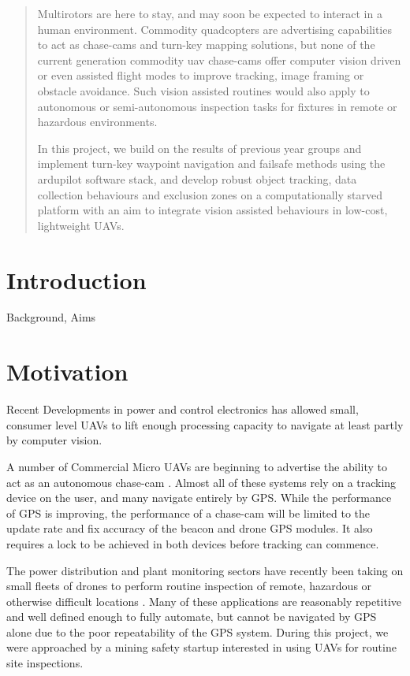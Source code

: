 \documentclass[a4paper, 11pt, titlepage]{article}
\begin{document}
  

  \begin{abstract}
  Multirotors are here to stay, and may soon be expected to interact in a human environment.
  Commodity quadcopters are advertising capabilities to act as  chase-cams and turn-key mapping solutions, but none of the current generation commodity uav chase-cams offer computer vision driven or even assisted flight modes to improve tracking, image framing or obstacle avoidance.  Such vision assisted routines would also apply to autonomous or semi-autonomous inspection tasks for fixtures in remote or hazardous environments.

  In this project, we build on the results of previous year groups and implement turn-key waypoint navigation and failsafe methods using the ardupilot software stack, and develop robust object tracking, data collection behaviours and exclusion zones on a computationally starved platform with an aim to integrate vision assisted behaviours in low-cost, lightweight UAVs.
  \end{abstract}

  \tableofcontents
  \pagebreak
  \section{Introduction}
    Background, Aims
    \section{Motivation}
      Recent Developments in power and control electronics has allowed small, consumer level UAVs to lift enough processing capacity to navigate at least partly by computer vision.

      A number of Commercial Micro UAVs are beginning to advertise the ability to act as an autonomous chase-cam \cite{Lily} \cite{AirDog}.  Almost all of these systems rely on a tracking device on the user, and many navigate entirely by GPS.  While the performance of GPS is improving, the performance of a chase-cam will be limited to the update rate and fix accuracy of the beacon and drone GPS modules.  It also requires a lock to be achieved in both devices before tracking can commence.

      The power distribution and plant monitoring sectors have recently been taking on small fleets of drones to perform routine inspection of remote, hazardous or otherwise difficult locations \cite{RopeAccess}.  Many of these applications are reasonably repetitive and well defined enough to fully automate, but cannot be navigated by GPS alone due to the poor repeatability of the GPS system.
      During this project, we were approached by a mining safety startup interested in using UAVs for routine site inspections.
\end{document}
